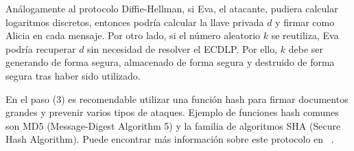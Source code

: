 Análogamente al protocolo Diffie-Hellman, si Eva, el atacante, pudiera calcular logaritmos discretos, entonces podría calcular la llave privada $d$ y firmar como Alicia en cada mensaje. Por otro lado, si el número aleatorio $k$ se reutiliza, Eva podría recuperar $d$ sin necesidad de resolver el ECDLP. Por ello, $k$ debe ser generando de forma segura, almacenado de forma segura y destruido de forma segura tras haber sido utilizado.

En el paso (3) es recomendable utilizar una función hash para firmar documentos grandes y prevenir varios tipos de ataques. Ejemplo de funciones hash comunes son MD5 (Message-Digest Algorithm 5) y la familia de algoritmos SHA (Secure Hash Algorithm). Puede encontrar más información sobre este protocolo en ~\cite{Hankerson:2003}.

\clearpage
